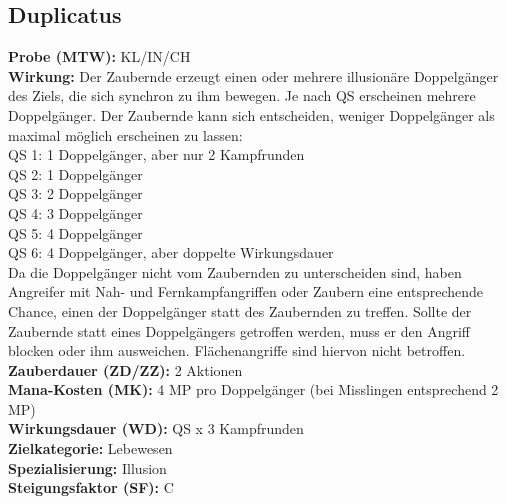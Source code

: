 \subsection{Duplicatus}
\label{chap:duplicatus}
\textbf{Probe (MTW):} KL/IN/CH \\
\textbf{Wirkung:} Der Zaubernde erzeugt einen oder mehrere illusionäre Doppelgänger des Ziels, die sich synchron zu ihm bewegen. Je nach QS erscheinen mehrere Doppelgänger. Der Zaubernde kann sich entscheiden, weniger Doppelgänger als maximal möglich erscheinen zu lassen:\\
QS 1: 1 Doppelgänger, aber nur 2 Kampfrunden\\
QS 2: 1 Doppelgänger\\
QS 3: 2 Doppelgänger\\
QS 4: 3 Doppelgänger\\
QS 5: 4 Doppelgänger\\
QS 6: 4 Doppelgänger, aber doppelte Wirkungsdauer\\
Da die Doppelgänger nicht vom Zaubernden zu unterscheiden sind, haben Angreifer mit Nah- und Fernkampfangriffen oder Zaubern eine entsprechende Chance, einen der Doppelgänger statt des Zaubernden zu treffen. Sollte der Zaubernde statt eines Doppelgängers getroffen werden, muss er den Angriff blocken oder ihm ausweichen. Flächenangriffe sind hiervon nicht betroffen. \\
\textbf{Zauberdauer (ZD/ZZ):} 2 Aktionen \\
\textbf{Mana-Kosten (MK):} 4 MP pro Doppelgänger (bei Misslingen entsprechend 2 MP) \\
\textbf{Wirkungsdauer (WD):} QS x 3 Kampfrunden \\
\textbf{Zielkategorie:} Lebewesen \\
\textbf{Spezialisierung:} Illusion \\
\textbf{Steigungsfaktor (SF):} C


